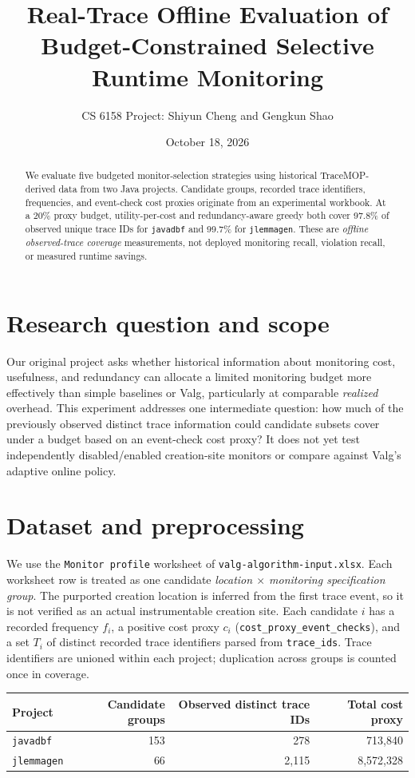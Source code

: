 \documentclass[10pt,letterpaper]{article}
\title{Real-Trace Offline Evaluation of Budget-Constrained Selective Runtime Monitoring}
\author{CS 6158 Project: Shiyun Cheng and Gengkun Shao}
\date{October 18, 2026}
\begin{document}
\maketitle
\vspace{-1em}
\begin{abstract}
We evaluate five budgeted monitor-selection strategies using historical TraceMOP-derived data from two Java projects. Candidate groups, recorded trace identifiers, frequencies, and event-check cost proxies originate from an experimental workbook. At a 20\% proxy budget, utility-per-cost and redundancy-aware greedy both cover 97.8\% of observed unique trace IDs for \texttt{javadbf} and 99.7\% for \texttt{jlemmagen}. These are \emph{offline observed-trace coverage} measurements, not deployed monitoring recall, violation recall, or measured runtime savings.
\end{abstract}
\section{Research question and scope}
Our original project asks whether historical information about monitoring cost, usefulness, and redundancy can allocate a limited monitoring budget more effectively than simple baselines or Valg, particularly at comparable \emph{realized} overhead. This experiment addresses one intermediate question: how much of the previously observed distinct trace information could candidate subsets cover under a budget based on an event-check cost proxy? It does not yet test independently disabled/enabled creation-site monitors or compare against Valg's adaptive online policy.
\section{Dataset and preprocessing}
We use the \texttt{Monitor profile} worksheet of \texttt{valg-algorithm-input.xlsx}. Each worksheet row is treated as one candidate \emph{location $\times$ monitoring specification group}. The purported creation location is inferred from the first trace event, so it is not verified as an actual instrumentable creation site. Each candidate $i$ has a recorded frequency $f_i$, a positive cost proxy $c_i$ (\texttt{cost\_proxy\_event\_checks}), and a set $T_i$ of distinct recorded trace identifiers parsed from \texttt{trace\_ids}. Trace identifiers are unioned within each project; duplication across groups is counted once in coverage.

\begin{center}
\begin{tabular}{lrrr}\toprule
Project & Candidate groups & Observed distinct trace IDs & Total cost proxy \\\midrule
\texttt{javadbf} & 153 & 278 & 713,840 \\
\texttt{jlemmagen} & 66 & 2,115 & 8,572,328 \\\bottomrule
\end{tabular}
\end{center}
\end{document}
